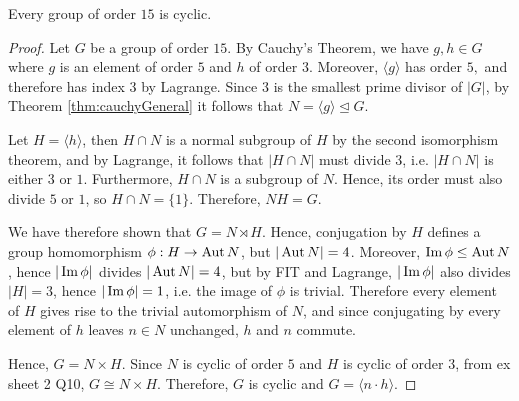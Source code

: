\begin{theorem}
  Every group of order $15$ is cyclic.
  \label{<+label+>}
\end{theorem}
\begin{proof}
  Let $G$ be a group of order $15$. By Cauchy's Theorem, we have $g, h\in G$ where $g$ is an
  element of order $5$ and $h$ of order $3$. Moreover, $\langle g \rangle$ has order $5,$ and therefore has index $3$ by Lagrange. Since $3$ is the smallest prime divisor of $|G|$, by Theorem \ref{thm:cauchyGeneral} it follows that $N=\langle g
  \rangle\trianglelefteq G$. 

  Let $H=\langle h \rangle$, then $H\cap N$ is a normal subgroup of
  $H$ by the second isomorphism theorem, and by Lagrange, it follows that $|H\cap N|$ must
  divide $3$, i.e. $|H\cap N|$ is either $3$ or $1$. Furthermore, $H\cap N$ is a subgroup of $N$. Hence, its order must also divide $5$  or $1$, so
  $H\cap N=\{1\}$. Therefore, $NH=G$. 

  We have therefore shown that $G= N\rtimes H$. Hence, conjugation by $H$
  defines a group homomorphism $\phi:H\to\operatorname{Aut} N$, but $|\operatorname{Aut} N|=4$. Moreover, $\operatorname{Im}\phi
  \leq \operatorname{Aut} N$, hence $|\operatorname{Im}\phi|$ divides $|\operatorname{Aut} N|=4$, but by FIT and Lagrange, $|\operatorname{Im} \phi|$ also divides $|H|=3$, hence
  $|\operatorname{Im}\phi|=1$, i.e. the image of $\phi$ is trivial. Therefore every element of $H$
  gives rise to the trivial automorphism of $N$, and since conjugating by every element of
  $h$ leaves $n\in N$ unchanged, $h$ and $n$ commute.

  Hence, $G=N\times H$. Since $N$ is cyclic of
  order $5$ and $H$ is cyclic of order $3$, from ex sheet 2 Q10, $G \cong N\times H$. Therefore, $G$ is cyclic and $G=\langle n\cdot h \rangle$.
\end{proof}




